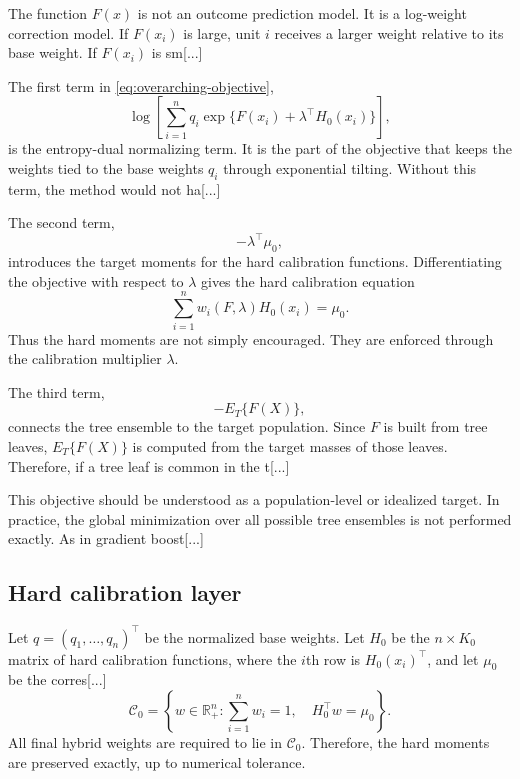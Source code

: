 \documentclass[11pt]{article}
\begin{document}
The function $F(x)$ is not an outcome prediction model. It is a log-weight correction model. If $F(x_i)$ is large, unit $i$ receives a larger weight relative to its base weight. If $F(x_i)$ is sm[...] 

The first term in \eqref{eq:overarching-objective},
\begin{equation*}
\log\left[
\sum_{i=1}^n
q_i\exp\{F(x_i)+\lambda^\top H_0(x_i)\}
\right],
\end{equation*}
is the entropy-dual normalizing term. It is the part of the objective that keeps the weights tied to the base weights $q_i$ through exponential tilting. Without this term, the method would not ha[...]

The second term,
\begin{equation*}
-\lambda^\top\mu_0,
\end{equation*}
introduces the target moments for the hard calibration functions. Differentiating the objective with respect to $\lambda$ gives the hard calibration equation
\begin{equation*}
\sum_{i=1}^n w_i(F,\lambda)H_0(x_i)=\mu_0.
\end{equation*}
Thus the hard moments are not simply encouraged. They are enforced through the calibration multiplier $\lambda$.

The third term,
\begin{equation*}
-E_T\{F(X)\},
\end{equation*}
connects the tree ensemble to the target population. Since $F$ is built from tree leaves, $E_T\{F(X)\}$ is computed from the target masses of those leaves. Therefore, if a tree leaf is common in the t[...] 

This objective should be understood as a population-level or idealized target. In practice, the global minimization over all possible tree ensembles is not performed exactly. As in gradient boost[...]

\subsection{Hard calibration layer}

Let $q=(q_1,\ldots,q_n)^\top$ be the normalized base weights. Let $H_0$ be the $n\times K_0$ matrix of hard calibration functions, where the $i$th row is $H_0(x_i)^\top$, and let $\mu_0$ be the corres[...]
\begin{equation*}
\mathcal{C}_0
=
\left\{
 w\in\mathbb{R}_+^n:
 \sum_{i=1}^n w_i=1,
 \quad
 H_0^\top w=\mu_0
\right\}.
\end{equation*}
All final hybrid weights are required to lie in $\mathcal{C}_0$. Therefore, the hard moments are preserved exactly, up to numerical tolerance.
\end{document}

